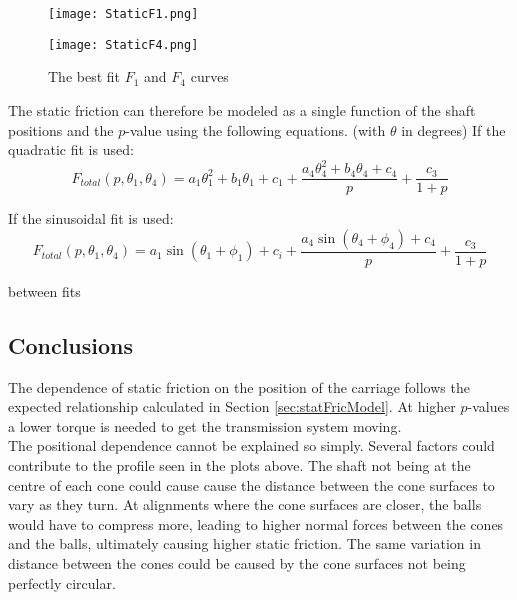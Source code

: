 \documentclass[12pt]{article}
\begin{document}
\begin{figure}[!h]
    \centering
    \begin{minipage}{0.49\textwidth}       
         \texttt{[image: StaticF1.png]}
    \end{minipage}
    \begin{minipage}{0.49\textwidth}       
         \texttt{[image: StaticF4.png]}
    \end{minipage}

\label{fig:staticFitCurves}
\caption{The best fit $F_1$ and $F_4$ curves}

\end{figure}

The static friction can therefore be modeled as a single function of the shaft positions and the $p$-value using the following equations. (with $\theta$ in degrees)
If the quadratic fit is used:\\

$$F_{total} (p, \theta_1, \theta_4) = a_1 \theta_1^2 + b_1 \theta_1 + c_1 + \frac{ a_4 \theta_4^2 + b_4 \theta_4 + c_4 }{p} + \frac{c_3}{1+p}$$

If the sinusoidal fit is used:\\
$$F_{total} (p, \theta_1, \theta_4)= a_1 \sin\left( \theta_1 + \phi_1  \right)  + c_i + \frac{a_4 \sin\left( \theta_4 + \phi_4  \right)  + c_4}{p} + \frac{c_3}{1+p}$$

\comparison between fits

 
\subsection{Conclusions}
The dependence of static friction on the position of the carriage follows the expected relationship calculated in Section \ref{sec:statFricModel}. At higher $p$-values a lower torque is needed to get the transmission system moving. \\

The positional dependence cannot be explained so simply. Several factors could contribute to the profile seen in the plots above. The shaft not being at the centre of each cone could cause cause the distance between the cone surfaces to vary as they turn. At alignments where the cone surfaces are closer, the balls would have to compress more, leading to higher normal forces between the cones and the balls, ultimately causing higher static friction. The same variation in distance between the cones could be caused by the cone surfaces not being perfectly circular.\\
\end{document}
